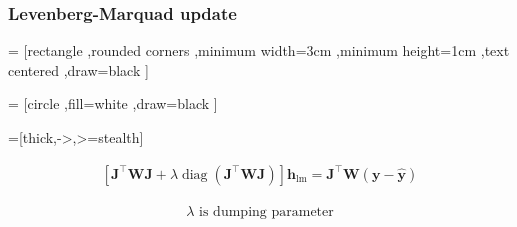 \documentclass[]{beamer}
\begin{document}
\begin{frame}
    \frametitle{Levenberg-Marquad update}

     = [rectangle
                        ,rounded corners
                        ,minimum width=3cm
                        ,minimum height=1cm
                        ,text centered
                        ,draw=black
                        ]

     = [circle
                        ,fill=white
                        ,draw=black
                       ]                    

    =[thick,->,>=stealth]                    
    
    \begin{eqnarray*}
        \left[\boldsymbol{J}^{\top} \boldsymbol{W} \boldsymbol{J}
              +\lambda \operatorname{diag}\left(\boldsymbol{J}^{\top} \boldsymbol{W} \boldsymbol{J}\right)
        \right]
         \boldsymbol{h}_{\mathrm{lm}}
         =\boldsymbol{J}^{\top} \boldsymbol{W}(\boldsymbol{y}-\hat{\boldsymbol{y}})
    \end{eqnarray*}

    \begin{eqnarray*}
        \lambda \text{ is dumping parameter}
    \end{eqnarray*}
    
\end{frame}
\end{document}
